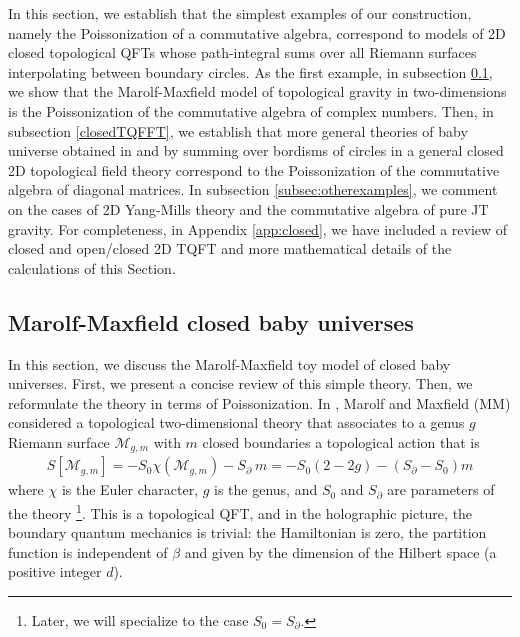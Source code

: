 \documentclass[a4paper,11pt]{article}
\theoremstyle{definition}
\numberwithin{equation}{section}
\newcommand{\mM}{\mathcal{M}}
\newcommand{\p}{\partial}
\begin{document}
In this section, we establish that the simplest examples of our construction, namely the Poissonization of a commutative algebra, correspond to models of 2D closed topological QFTs whose path-integral sums over all Riemann surfaces interpolating between boundary circles. As the first example, in subsection \ref{MMmodel}, we show that the Marolf-Maxfield model of topological gravity in two-dimensions \cite{MM} is the Poissonization of the commutative algebra of complex numbers. Then, in subsection \ref{closedTQFFT}, we establish that more general theories of baby universe obtained in \cite{gardiner20212D} and \cite{banerjee2022comments} by summing over bordisms of circles in a general closed 2D topological field theory correspond to the Poissonization of the commutative algebra of diagonal matrices. In subsection \ref{subsec:otherexamples}, we comment on the cases of 2D Yang-Mills theory and the commutative algebra of pure JT gravity. For completeness, in Appendix \ref{app:closed}, we have included a review of closed and open/closed 2D TQFT and more mathematical details of the calculations of this Section.


\subsection{Marolf-Maxfield closed baby universes}\label{MMmodel}


In this section, we discuss the Marolf-Maxfield toy model of closed baby universes. First, we present a concise review of this simple theory. Then, we reformulate the theory in terms of Poissonization. In \cite{MM}, Marolf and Maxfield (MM) considered a topological two-dimensional theory that associates to a genus $g$ Riemann surface $\mM_{g,m}$ with $m$ closed boundaries a topological action that is
\begin{eqnarray}
    S[\mathcal{M}_{g,m}]=-S_0\chi(\mathcal{M}_{g,m})-S_\p \:m=-S_0(2-2g)-(S_\p-S_0) m
\end{eqnarray}
where $\chi$ is the Euler character, $g$ is the genus, and $S_0$ and $S_\p$ are parameters of the theory \footnote{Later, we will specialize to the case $S_0=S_\partial$.}.
This is a topological QFT, and in the holographic picture, the boundary quantum mechanics is trivial: the Hamiltonian is zero, the partition function is independent of $\beta$ and given by the dimension of the Hilbert space (a positive integer $d$). 
\end{document}
